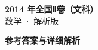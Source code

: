 \documentclass[zihao=-4, a4paper]{ctexart}
\begin{document}
\begin{center}
  {\Large\bfseries 2014 年全国Ⅱ卷（文科）}\\[4pt]
  {\large 数学 · 解析版}
\end{center}
\medskip
{}

\clearpage
{}
\begin{center}{\Large\bfseries 参考答案与详细解析}\end{center}
\medskip

\end{document}
